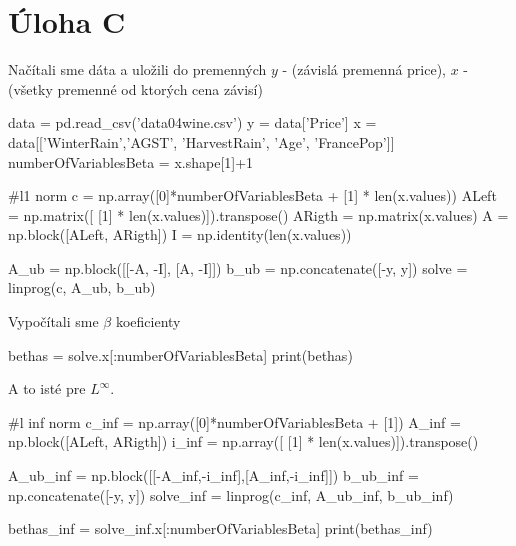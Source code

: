 \documentclass[12pt,oneside,a4paper,slovak]{article}
\begin{document}
   

\section*{Úloha C}
Načítali sme dáta a uložili do premenných $y$ - (závislá premenná price), $x$ - (všetky premenné od ktorých cena závisí)
\begin{python}
data = pd.read_csv('data\A04wine.csv')
y = data['Price']
x = data[['WinterRain','AGST', 'HarvestRain', 'Age', 'FrancePop']]
numberOfVariablesBeta = x.shape[1]+1
\end{python}
\begin{python}
#l1 norm
c = np.array([0]*numberOfVariablesBeta + [1] * len(x.values))
ALeft = np.matrix([ [1] * len(x.values)]).transpose()
ARigth = np.matrix(x.values)
A = np.block([ALeft, ARigth])
I = np.identity(len(x.values))   
\end{python}

\begin{python}
A_ub = np.block([[-A, -I], [A, -I]])
b_ub = np.concatenate([-y, y])
solve = linprog(c, A_ub, b_ub)
\end{python}
Vypočítali sme $\beta$ koeficienty
\begin{python}
bethas = solve.x[:numberOfVariablesBeta]
print(bethas)
\end{python}
A to isté pre $L^\infty$.
\begin{python}
#l inf norm
c_inf = np.array([0]*numberOfVariablesBeta + [1])
A_inf = np.block([ALeft, ARigth])
i_inf = np.array([ [1] * len(x.values)]).transpose()

A_ub_inf = np.block([[-A_inf,-i_inf],[A_inf,-i_inf]])
b_ub_inf = np.concatenate([-y, y])
solve_inf = linprog(c_inf, A_ub_inf, b_ub_inf)

bethas_inf = solve_inf.x[:numberOfVariablesBeta]
print(bethas_inf)
\end{python}
\end{document}
